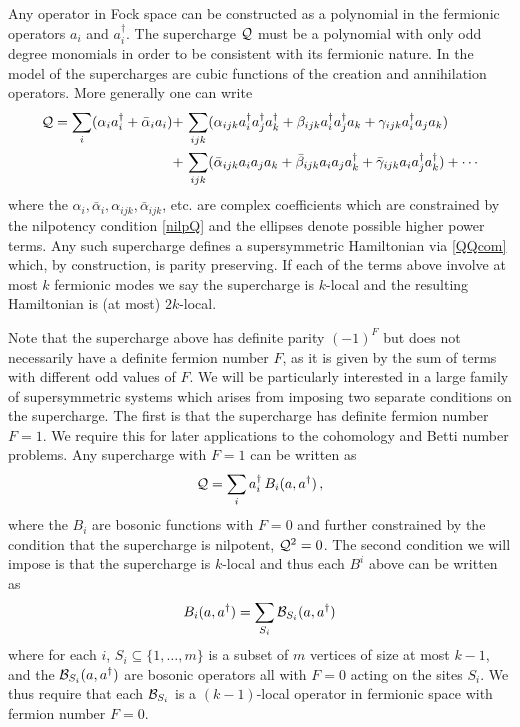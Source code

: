 \documentclass[11pt]{article}
\numberwithin{equation}{section}
\def\cB{{\cal B}}
\def\cQ{{\cal Q}}
\newcommand\equ[1] {\begin{equation}#1\end{equation}}
\newcommand\eqss[1] {\begin{align}\begin{split}#1\end{split}\end{align}}
\renewcommand\( {\left(}
\renewcommand\) {\right)}
\begin{document}
Any operator in Fock space can be constructed as a polynomial in the fermionic operators $a_{i}$ and $a_{i}^{\dagger}$. The supercharge $\cQ$ must be a polynomial with only odd degree monomials in order to be consistent with its fermionic nature. In the model of \cite{Nicolai:1976xp} the supercharges are cubic functions of the creation and annihilation operators. More generally one can write
\eqss{
\cQ=\sum_{i}(\alpha_{i}a_{i}^{\dagger}+\bar \alpha_{i}a_{i})+\,&\sum_{ijk}( \alpha_{ijk}a^{\dagger}_{i}a^{\dagger}_{j}a^{\dagger}_{k}+\beta_{ijk}a^{\dagger}_{i}a^{\dagger}_{j}a_{k}+\gamma_{ijk}a^{\dagger}_{i}a_{j}a_{k})  \\
+\,&\sum_{ijk}( \bar \alpha_{ijk}a_{i}a_{j}a_{k}+\bar\beta_{ijk}a_{i}a_{j}a^{\dagger}_{k}+\bar\gamma_{ijk}a_{i}a^{\dagger}_{j}a^{\dagger}_{k})+\cdots
}
where  the $\alpha_{i},\bar \alpha_{i},\alpha_{ijk},\bar \alpha_{ijk}$, etc. are complex coefficients which are constrained  by the nilpotency condition \eqref{nilpQ} and the ellipses denote possible higher power terms. Any such supercharge defines a supersymmetric Hamiltonian via \eqref{QQcom} which, by construction, is parity preserving. If each of the terms above involve at most $k$ fermionic modes we say the supercharge is $k$-local and the resulting Hamiltonian is (at most) $2k$-local. 

Note that the supercharge above has definite parity $(-1)^{F}$ but does not necessarily have a definite fermion number $F$, as it is given by the sum of terms with different odd values of $F$. We will be particularly interested in a large family of supersymmetric systems which arises from imposing two separate conditions on the supercharge.  The first is that the supercharge has definite fermion number $F=1$. We require this for later applications to the cohomology and Betti number problems. Any supercharge with $F=1$ can be written as 
\equ{
\cQ=\sum_{i}a_{i}^{\dagger}\, B_{i}(a,a^{\dagger})\,, 
}
where the $B_{i}$ are bosonic functions with $F=0$ and further constrained by the condition that the supercharge is nilpotent, $\cQ^{2}=0$. The second condition we will impose is that the supercharge is $k$-local and thus each $B^{i}$ above can be written as
\equ{
B_{i}(a,a^{\dagger})=\sum_{S_{i}} \cB_{S_{i}}(a,a^{\dagger})
}
where for each $i$,  $S_{i}\subseteq\{1,\dots,m\}$ is a subset of $m$ vertices of size at most $k-1$, and the $\cB_{S_i}(a,a^{\dagger})$ are bosonic operators all with $F=0$ acting on the sites $S_{i}$. We thus require that each $\cB_{S_{i}}$ is a $(k-1)$-local operator in fermionic space with fermion number $F=0$. 
\end{document}
